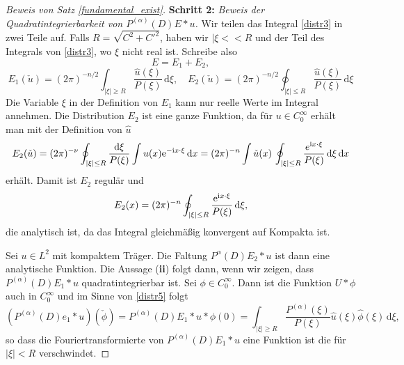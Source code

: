 \begin{proof}[Beweis von Satz \ref{fundamental_exist}]
\textbf{Schritt 2:} \emph{Beweis der Quadratintegrierbarkeit von $P^{(\alpha)}(D) E * u$.}
Wir teilen das Integral \eqref{distr3} in zwei Teile auf. Falls $R=\sqrt{C^2 + C'^2}$, haben wir $|\xi<<R$ und der Teil des Integrals von \eqref{distr3}, wo $\xi$ nicht real ist. Schreibe also 
\begin{equation}\label{distr4}
E=E_1 + E_2,
\end{equation}
\begin{equation}\label{distr5}
E_1(\check u) = (2\pi)^{-n/2} \int_{|\xi|\ge R} \frac{\hat u(\xi)}{P(\xi)}\, \mathrm d\xi, \quad E_2(\check u)= (2\pi)^{-n/2} \oint_{|\xi|\le R} \frac{\hat u(\xi)}{P(\xi)}\, \mathrm d\xi
\end{equation}
Die Variable $\xi$ in der Definition von $E_1$ kann nur reelle Werte im Integral annehmen. Die Distribution $E_2$ ist eine ganze Funktion, da für $u\in C_0^\infty$ erhält man mit der Definition von $\hat u$
\begin{equation}
E_2(\check u) = (2\pi)^{-\nu} \oint_{|\xi |\le R} \frac{\mathrm d\xi}{P(\xi)} \int u(x) \mathrm e^{-\mathrm i x\cdot\xi}\, \mathrm dx= (2\pi)^{-n} \int \check u(x) \, \oint_{|\xi|\le R} \frac{e^{\mathrm i x\cdot \xi}}{P(\xi)}\, \mathrm d\xi \, \mathrm dx
\end{equation}
erhält. Damit ist $E_2$ regulär und
\begin{equation}
E_2(x) = (2\pi)^{-n} \oint_{|\xi|\le R} \frac{\mathrm e^{\mathrm i x\cdot \xi}}{P(\xi)}\, \mathrm d\xi,
\end{equation}
die analytisch ist, da das Integral gleichmäßig konvergent auf Kompakta ist. 

Sei $u\in L^2$ mit kompaktem Träger. Die Faltung $P^{\alpha}(D)E_2 *u$ ist dann eine analytische Funktion.  Die Aussage ({\bf ii}) folgt dann, wenn wir zeigen, dass $P^{(\alpha)}(D) E_1 * u$ quadratintegrierbar ist.  Sei $\phi \in C_0^\infty$. Dann ist die Funktion $U*\phi$ auch in $C_0^\infty$ und im Sinne von \eqref{distr5} folgt
\begin{equation}
(P^{(\alpha)} (D) e_1 * u) (\check \phi) = P^{(\alpha)}(D) E_1 * u * \phi(0) = \int_{|\xi| \ge R} \frac{P^{(\alpha)}(\xi)}{P(\xi)} \hat u(\xi) \hat \phi(\xi) \, \mathrm d\xi,
\end{equation}     
so dass die Fouriertransformierte von $P^{(\alpha)}(D) E_1 * u$ eine Funktion ist die für $|\xi|<R$ verschwindet. 
\end{proof}
